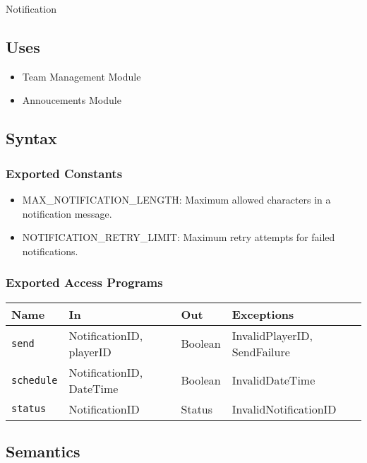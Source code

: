\documentclass[12pt, titlepage]{article}
\begin{document}
Notification

\subsection{Uses}

\begin{itemize}
    \item Team Management Module
    \item Annoucements Module
\end{itemize}

\subsection{Syntax}

\subsubsection{Exported Constants}

\begin{itemize}
    \item MAX\_NOTIFICATION\_LENGTH: Maximum allowed characters in a notification message.
    \item NOTIFICATION\_RETRY\_LIMIT: Maximum retry attempts for failed notifications.
\end{itemize}

\subsubsection{Exported Access Programs}

\begin{center}
\begin{tabular}{p{2cm} p{4cm} p{4cm} p{2cm}}
\hline
\textbf{Name} & \textbf{In} & \textbf{Out} & \textbf{Exceptions} \\
\hline
\texttt{send} & NotificationID, playerID & Boolean & InvalidPlayerID, SendFailure \\
\hline
\texttt{schedule} & NotificationID, DateTime & Boolean & InvalidDateTime \\
\hline
\texttt{status} & NotificationID & Status & InvalidNotificationID \\
\hline
\end{tabular}
\end{center}

\subsection{Semantics}
\end{document}
